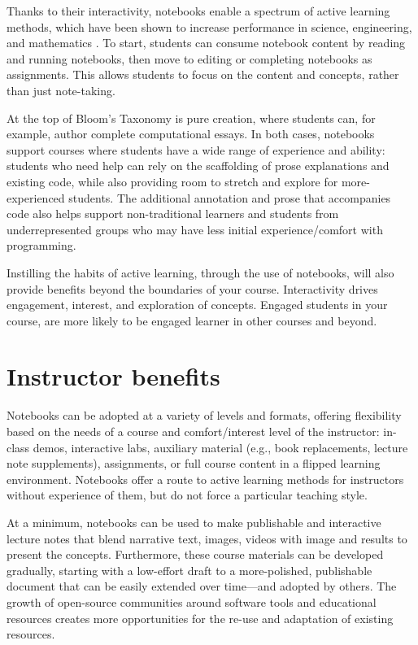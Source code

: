 \documentclass[]{book}
\begin{document}
Thanks to their interactivity, notebooks enable a spectrum of active
learning methods, which have been shown to increase performance in
science, engineering, and mathematics \citep{freeman2014active}. To
start, students can consume notebook content by reading and running
notebooks, then move to editing or completing notebooks as assignments.
This allows students to focus on the content and concepts, rather than
just note-taking.

At the top of Bloom's Taxonomy is pure creation, where students can, for
example, author complete computational essays. In both cases, notebooks
support courses where students have a wide range of experience and
ability: students who need help can rely on the scaffolding of prose
explanations and existing code, while also providing room to stretch and
explore for more-experienced students. The additional annotation and
prose that accompanies code also helps support non-traditional learners
and students from underrepresented groups who may have less initial
experience/comfort with programming.

Instilling the habits of active learning, through the use of notebooks,
will also provide benefits beyond the boundaries of your course.
Interactivity drives engagement, interest, and exploration of concepts.
Engaged students in your course, are more likely to be engaged learner
in other courses and beyond.

\section{Instructor benefits}\label{instructor-benefits}

Notebooks can be adopted at a variety of levels and formats, offering
flexibility based on the needs of a course and comfort/interest level of
the instructor: in-class demos, interactive labs, auxiliary material
(e.g., book replacements, lecture note supplements), assignments, or
full course content in a flipped learning environment. Notebooks offer a
route to active learning methods for instructors without experience of
them, but do not force a particular teaching style.

At a minimum, notebooks can be used to make publishable and interactive
lecture notes that blend narrative text, images, videos with image and
results to present the concepts. Furthermore, these course materials can
be developed gradually, starting with a low-effort draft to a
more-polished, publishable document that can be easily extended over
time---and adopted by others. The growth of open-source communities
around software tools and educational resources creates more
opportunities for the re-use and adaptation of existing resources.
\end{document}
